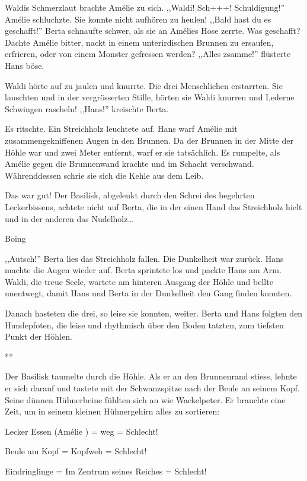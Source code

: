 \documentclass[11pt,titlepage,a5paper]{book}
\newcommand{\sterne}{\par{\centering ***\par}}
\newcommand{\am}{Amélie }
\begin{document}
Waldis Schmerzlaut brachte \am zu sich. ,,Waldi! Sch+++! Schuldigung!'' \am schluchzte. Sie konnte nicht aufhören zu heulen! ,,Bald hast du es geschafft!'' Berta schnaufte schwer, als sie an Amélies Hose zerrte. Was geschafft? Dachte \am bitter, nackt in einem unterirdischen Brunnen zu ersaufen, erfrieren, oder von einem Monster gefressen werden? ,,Alles zsamme!'' flüsterte Hans böse.

Waldi hörte auf zu jaulen und knurrte. Die drei Menschlichen erstarrten. Sie lauschten und in der vergrösserten Stille, hörten sie Waldi knurren und Lederne Schwingen rascheln! ,,Hans!'' kreischte Berta.

Es ritschte. Ein Streichholz leuchtete auf. Hans warf \am mit zusammengekniffenen Augen in den Brunnen. Da der Brunnen in der Mitte der Höhle war und zwei Meter entfernt, warf er sie tatsächlich. Es rumpelte, als \am gegen die Brunnenwand krachte und im Schacht verschwand. Währenddessen schrie sie sich die Kehle aus dem Leib.

Das war gut! Der Basilisk, abgelenkt durch den Schrei des begehrten Leckerbissens, achtete nicht auf Berta, die in der einen Hand das Streichholz hielt und in der anderen das Nudelholz\dots

\begin{LARGE}
Boing
\end{LARGE}

,,Autsch!'' Berta lies das Streichholz fallen. Die Dunkelheit war zurück. Hans machte die Augen wieder auf. Berta sprintete los und packte Hans am Arm. Waldi, die treue Seele, wartete am hinteren Ausgang der Höhle und bellte unentwegt, damit Hans und Berta in der Dunkelheit den Gang finden konnten. 

Danach hasteten die drei, so leise sie konnten, weiter. Berta und Hans folgten den Hundepfoten, die leise und rhythmisch über den Boden tatzten, zum tiefsten Punkt der Höhlen.

\sterne

Der Basilisk taumelte durch die Höhle. Als er an den Brunnenrand stiess, lehnte er sich darauf und tastete mit der Schwanzspitze nach der Beule an seinem Kopf. Seine dünnen Hühnerbeine fühlten sich an wie Wackelpeter. Er brauchte eine Zeit, um in seinem kleinen Hühnergehirn alles zu sortieren: 

Lecker Essen (\am ) = weg = Schlecht!

Beule am Kopf = Kopfweh = Schlecht! 

Eindringlinge = Im Zentrum seines Reiches = Schlecht! 
\end{document}
